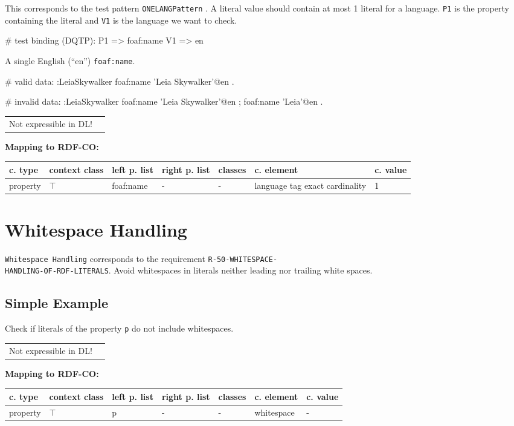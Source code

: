 \documentclass{llncs}
\newcommand{\ms}[1]{\texttt{#1}}
\newenvironment{gcotable}{
  \scriptsize
  \sffamily
  \vspace{0cm}
	\begin{center}
	\textbf{\vspace{0.4cm}Mapping to RDF-CO:} \\
  \begin{tabular}{l|l|l|l|l|l|l}
	\hline
  \textbf{c. type} & \textbf{context class} & \textbf{left p. list} & \textbf{right p. list} & \textbf{classes} & \textbf{c. element} & \textbf{c. value} \\
  \hline

}{
  \hline
  \end{tabular}
	\end{center}
}
\newenvironment{DL}{
  \vspace{0cm}
	\begin{center}
  \begin{tabular}{r l}

}{
  \end{tabular}
	\end{center}
}
\begin{document}
This corresponds to the test pattern \ms{ONELANGPattern} \cite{Kontokostas2014}.
A literal value should contain at most 1 literal for a language. 
\ms{P1} is the property containing the literal and \ms{V1} is the language we want to check.

\begin{ex}
# test binding (DQTP):
P1 => foaf:name
V1 => en
\end{ex}

A single English (“en”) \ms{foaf:name}.

\begin{ex}
# valid data:
:LeiaSkywalker
    foaf:name 'Leia Skywalker'@en .
\end{ex}

\begin{ex}
# invalid data:
:LeiaSkywalker
    foaf:name 'Leia Skywalker'@en ;
    foaf:name 'Leia'@en .
\end{ex}

\begin{DL}
Not expressible in DL!
\end{DL}

\begin{gcotable}
property & $\top$ & foaf:name & - & - & language tag exact cardinality & 1 \\
\end{gcotable}

\section{Whitespace Handling}

\ms{Whitespace Handling} corresponds to the requirement
\ms{R-50-WHITESPACE-} \\
\ms{HANDLING-OF-RDF-LITERALS}.
Avoid whitespaces in literals neither leading nor trailing white spaces.

\subsection{Simple Example}

Check if literals of the property \ms{p} do not include whitespaces.

\begin{DL}
Not expressible in DL!
\end{DL}

\begin{gcotable}
property & $\top$ & p & - & - & whitespace & - \\
\end{gcotable}
\end{document}

